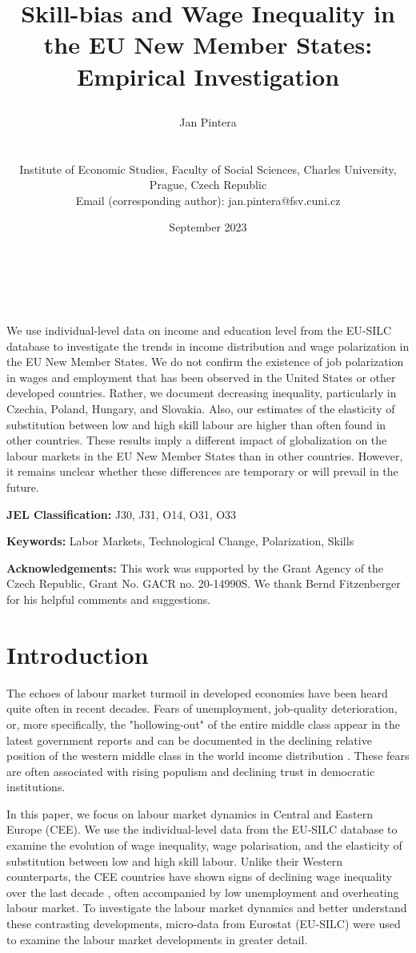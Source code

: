 \documentclass[11pt]{article}
\title{\begin{LARGE}Skill-bias and Wage Inequality in the EU New Member States: Empirical Investigation\end{LARGE}}
\author{    
    \begin{large}Jan Pintera\end{large} \\\vspace{5mm} \begin{small} Institute of Economic Studies, Faculty of Social Sciences, Charles University,\\ Prague, Czech Republic\\
    Email (corresponding author): jan.pintera@fsv.cuni.cz \end{small}
}
\date{September 2023}
\makeatletter
\renewcommand{\maketitle}{\bgroup\setlength{\parindent}{0pt}
\begin{flushright}
  \textbf{\@title}\\
  \vspace{5mm}
  \@author\\
  \vspace{5mm}
  \@date
\end{flushright}\egroup
}
\renewenvironment{abstract}
 {\small
  \begin{flushleft}
  \bfseries \abstractname\vspace{-.5em}\vspace{0pt}
  \end{flushleft}
  \list{}{%
    \setlength{\leftmargin}{0mm}%
    \setlength{\rightmargin}{\leftmargin}%
  }%
  \item\relax}
 {\endlist}
\def \jel {	J30, J31, O14, O31, O33}
\def \Keywords {Labor Markets, Technological Change, Polarization, Skills}
\makeatother
\begin{document}
\maketitle

\thispagestyle{empty}
\begin{abstract}
We use individual-level data on income and education level from the EU-SILC database to investigate the trends in income distribution and wage polarization in the EU New Member States. We do not confirm the existence of job polarization in wages and employment that has been observed in the United States or other developed countries. Rather, we document decreasing inequality, particularly in Czechia, Poland, Hungary, and Slovakia. Also, our estimates of the elasticity of substitution between low and 
high skill labour are higher than often found in other countries. These results imply a different impact of globalization on the labour markets in the EU New Member States than in other countries. However, it remains unclear whether these differences are temporary or will prevail in the future.
\bigskip

\textbf{JEL Classification:} \jel

\textbf{Keywords:}  \Keywords

\bigskip
\textbf{Acknowledgements:}
This work was supported by the Grant Agency of the Czech Republic, Grant No. GACR no. 20-14990S. We thank Bernd Fitzenberger for his helpful
comments and suggestions.

\end{abstract}
\clearpage
\setcounter{page}{1}



\section{Introduction}
The echoes of labour market turmoil in developed economies have been heard quite often in recent decades. Fears of unemployment, job-quality deterioration, or, more specifically, the "hollowing-out" of the entire middle class appear in the latest government reports \citetext{e.g., \citealt{rodrik2020economic}} and can be documented in the declining relative position of the western middle class in the world income distribution \citep{milanovic2020elephant}. These fears are often associated with rising populism and declining trust in democratic institutions.

In this paper, we focus on labour market dynamics in Central and Eastern Europe (CEE). We use the individual-level data from the EU-SILC database to examine the evolution of wage inequality, wage polarisation, and the elasticity of substitution between low and high skill labour. Unlike their Western counterparts, the CEE countries have shown signs of declining wage inequality over the last decade \citep{magda2021firms}, often accompanied by low unemployment and overheating labour market. To investigate the labour market dynamics and better understand these contrasting developments, micro-data from Eurostat (EU-SILC) were used to examine the labour market developments in greater detail.
\end{document}
